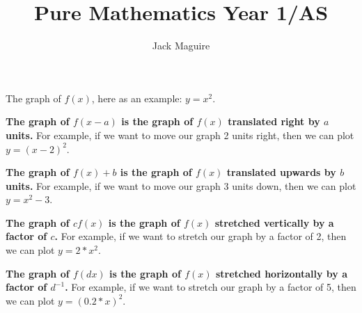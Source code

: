 


\title{Pure Mathematics Year 1/AS}
\author{Jack Maguire}
\date{}


\maketitle

\tableofcontents
\newpage


The graph of \(f(x)\), here as an example: \(y = x^2\).


\textbf{The graph of \(f(x-a)\) is the graph of \(f(x)\) translated right by \(a\) units.} For example, if we want to move our graph 2 units right, then we can plot \(y = (x-2)^2\).

\textbf{The graph of \(f(x)+b\) is the graph of \(f(x)\) translated upwards by \(b\) units.} For example, if we want to move our graph 3 units down, then we can plot \(y = x^2 - 3\).



\textbf{The graph of \(cf(x)\) is the graph of \(f(x)\) stretched vertically by a factor of \(c\).} For example, if we want to stretch our graph by a factor of 2, then we can plot \(y = 2 * x^2\).

\textbf{The graph of \(f(dx)\) is the graph of \(f(x)\) stretched horizontally by a factor of \(d^{-1}\).} For example, if we want to stretch our graph by a factor of 5, then we can plot \(y = (0.2 * x)^2\).

\setcounter{TransformationsCounter}{1}

